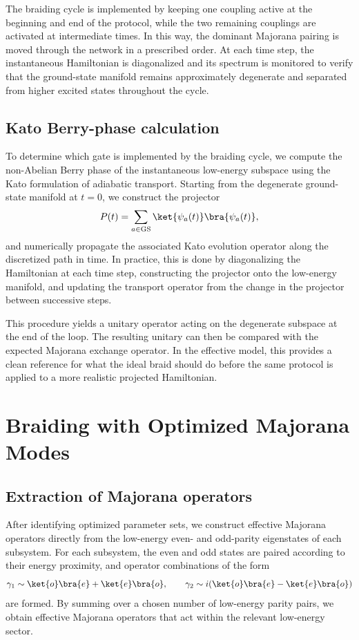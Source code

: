 The braiding cycle is implemented by keeping one coupling active at the beginning and end of the protocol, while the two remaining couplings are activated at intermediate times. In this way, the dominant Majorana pairing is moved through the network in a prescribed order. At each time step, the instantaneous Hamiltonian is diagonalized and its spectrum is monitored to verify that the ground-state manifold remains approximately degenerate and separated from higher excited states throughout the cycle.

\subsection{Kato Berry-phase calculation}
To determine which gate is implemented by the braiding cycle, we compute the non-Abelian Berry phase of the instantaneous low-energy subspace using the Kato formulation of adiabatic transport. Starting from the degenerate ground-state manifold at $t=0$, we construct the projector
\[
P(t) = \sum_{a \in \mathrm{GS}} \ket{\psi_a(t)}\bra{\psi_a(t)},
\]
and numerically propagate the associated Kato evolution operator along the discretized path in time. In practice, this is done by diagonalizing the Hamiltonian at each time step, constructing the projector onto the low-energy manifold, and updating the transport operator from the change in the projector between successive steps.

This procedure yields a unitary operator acting on the degenerate subspace at the end of the loop. The resulting unitary can then be compared with the expected Majorana exchange operator. In the effective model, this provides a clean reference for what the ideal braid should do before the same protocol is applied to a more realistic projected Hamiltonian.

\section{Braiding with Optimized Majorana Modes}
\subsection{Extraction of Majorana operators}
After identifying optimized parameter sets, we construct effective Majorana operators directly from the low-energy even- and odd-parity eigenstates of each subsystem. For each subsystem, the even and odd states are paired according to their energy proximity, and operator combinations of the form
\[
\gamma_1 \sim \ket{o}\bra{e} + \ket{e}\bra{o}, \qquad
\gamma_2 \sim i(\ket{o}\bra{e} - \ket{e}\bra{o})
\]
are formed. By summing over a chosen number of low-energy parity pairs, we obtain effective Majorana operators that act within the relevant low-energy sector.

